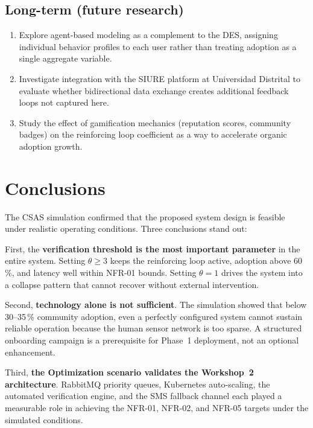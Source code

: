 \documentclass[conference,a4paper,10pt]{IEEEtran}
\begin{document}
\subsection{Long-term (future research)}

\begin{enumerate}
  \item Explore agent-based modeling as a complement to the DES,
    assigning individual behavior profiles to each user rather than
    treating adoption as a single aggregate variable.
  \item Investigate integration with the SIURE platform at
    Universidad Distrital to evaluate whether bidirectional data
    exchange creates additional feedback loops not captured here.
  \item Study the effect of gamification mechanics (reputation
    scores, community badges) on the reinforcing loop coefficient
    as a way to accelerate organic adoption growth.
\end{enumerate}

\section{Conclusions}

The CSAS simulation confirmed that the proposed system design is
feasible under realistic operating conditions. Three conclusions stand
out:

First, the \textbf{verification threshold is the most important
parameter} in the entire system. Setting $\theta \geq 3$ keeps the
reinforcing loop active, adoption above 60\,\%, and latency well
within NFR-01 bounds. Setting $\theta = 1$ drives the system into
a collapse pattern that cannot recover without external intervention.

Second, \textbf{technology alone is not sufficient}. The simulation
showed that below 30--35\,\% community adoption, even a perfectly
configured system cannot sustain reliable operation because the human
sensor network is too sparse. A structured onboarding campaign is
a prerequisite for Phase~1 deployment, not an optional enhancement.

Third, \textbf{the Optimization scenario validates the Workshop~2
architecture}. RabbitMQ priority queues, Kubernetes auto-scaling,
the automated verification engine, and the SMS fallback channel each
played a measurable role in achieving the NFR-01, NFR-02, and
NFR-05 targets under the simulated conditions.
\end{document}

